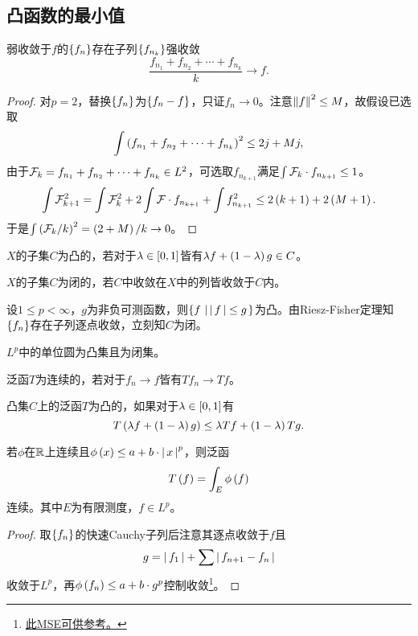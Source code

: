 \documentclass{ctexrep}
\begin{document}
  \subsection{凸函数的最小值}
  \begin{theorem}
  弱收敛于$f$的$\left\{f_n\right\}$存在子列$\left\{f_{n_k}\right\}$强收敛
  \[ \frac{f_{n_1} + f_{n_2} + \cdots + f_{n_k}}{k} \rightarrow f. \]
  \end{theorem}
  \begin{proof}
  对$p=2$，替换$\left\{f_n\right\}$为$\left\{f_n-f\right\}$，只证$f_n\rightarrow 0$。注意$\left\| f \right\|^2\le M$，故假设已选取
  \[ \int \left(f_{n_1} + f_{n_2} + \cdots + f_{n_k}\right)^2 \le 2j+Mj, \]
  由于$\mathcal{F}_k=f_{n_1} + f_{n_2} + \cdots + f_{n_k}\in L^2$，可选取$f_{n_{k+1}}$满足$\int \mathcal{F}_k \cdot f_{n_{k+1}}\le 1$。
  \[ \int \mathcal{F}_{k+1}^2 = \int \mathcal{F}_k^2 + 2\int \mathcal{F}\cdot f_{n_{k+1}} + \int f_{n_{k+1}}^2 \le 2\left(k+1\right)+2\left(M+1\right). \]
  于是$\int\left(\mathcal{F}_k/k\right)^2=\left(2+M\right)/k\rightarrow 0$。
  \end{proof}
  \begin{definition}
  $X$的子集$C$为凸的，若对于$\lambda\in\left[0,1\right]$皆有$\lambda f + \left(1-\lambda\right) g \in C$。
  \end{definition}
  \begin{definition}
  $X$的子集$C$为闭的，若$C$中收敛在$X$中的列皆收敛于$C$内。
  \end{definition}
  \begin{ex}
  设$1\le p<\infty$，$g$为非负可测函数，则$\left\{f \, \left| \, \left|\, f \,\right|\le g \right.\right\}$为凸。由Riesz-Fisher定理知$\left\{f_n\right\}$存在子列逐点收敛，立刻知$C$为闭。
  \end{ex}
  \begin{ex}
  $L^p$中的单位圆为凸集且为闭集。
  \end{ex}
  \begin{definition}
  泛函$T$为连续的，若对于$f_n\rightarrow f$皆有$Tf_n\rightarrow Tf$。
  \end{definition}
  \begin{definition}
  凸集$C$上的泛函$T$为凸的，如果对于$\lambda\in\left[0,1\right]$有
  \[ T\left(\lambda f + \left(1-\lambda\right) g\right) \le \lambda Tf + \left(1-\lambda\right)Tg. \]
  \end{definition}
  \begin{theorem}
  若$\phi$在$\mathbb{R}$上连续且$\phi\left(x\right)\le a+b\cdot\left|\, x \,\right|^p$，则泛函
  \[ T\left(f\right) = \int_E \phi\left(f\right) \]
  连续。其中$E$为有限测度，$f \in L^p$。
  \end{theorem}
  \begin{proof}
  取$\left\{f_n\right\}$的快速Cauchy子列后注意其逐点收敛于$f$且
  \[ g = \left|\, f_1 \,\right| + \sum \left|\, f_{n+1}-f_n \,\right| \]
  收敛于$L^p$，再$\phi\left(f_n\right) \le a+b\cdot g^p$控制收敛\footnote{\href{https://math.stackexchange.com/questions/2860453/prove-that-for-e-of-finite-measure-tf-int-e-phi-circ-f-is-continuous-o}{此MSE可供参考。}}。
  \end{proof}
\end{document}
